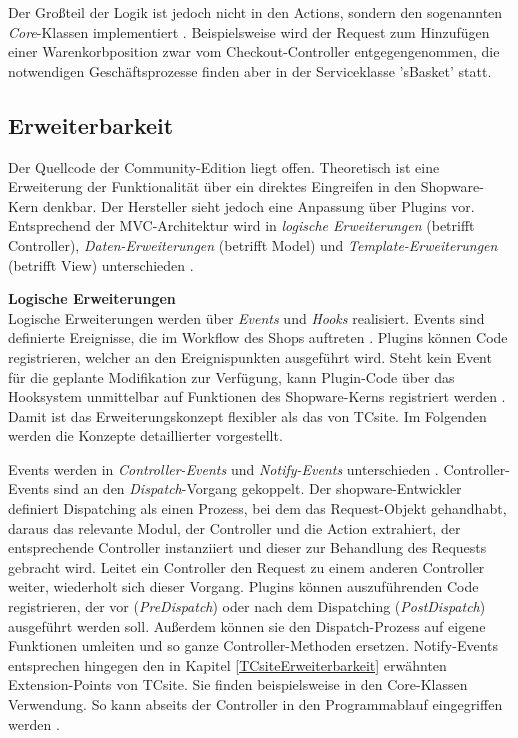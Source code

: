 \documentclass[11pt, a4paper, titlepage, listof=totoc, bibliography=totoc, index=totoc, twoside, openright, headings=normal, draft]{scrreprt}
\begin{document}
Der Großteil der Logik ist jedoch nicht in den Actions, sondern den sogenannten \emph{Core}-Klassen implementiert \citep{shopware4Docs}. Beispielsweise wird der Request zum Hinzufügen einer Warenkorbposition zwar vom Checkout-Controller entgegengenommen, die notwendigen Geschäftsprozesse finden aber in der Serviceklasse 'sBasket' statt.

\subsection{Erweiterbarkeit}
\label{shopwareErweiterbarkeit}
Der Quellcode der Community-Edition liegt offen. Theoretisch ist eine Erweiterung der Funktionalität über ein direktes Eingreifen in den Shopware-Kern denkbar. Der Hersteller sieht jedoch eine Anpassung über Plugins vor. Entsprechend der \ac{MVC}-Architektur wird in \emph{logische Erweiterungen} (betrifft Controller), \emph{Daten-Erweiterungen} (betrifft Model) und \emph{Template-Erweiterungen} (betrifft View) unterschieden \citep{shopware5Docs}.

\textbf{Logische Erweiterungen}\\
Logische Erweiterungen werden über \emph{Events} und \emph{Hooks} realisiert. Events sind \glqq definierte Ereignisse, die im Workflow des Shops auftreten\grqq{} \citep{shopware4Docs}. Plugins können Code registrieren, welcher an den Ereignispunkten ausgeführt wird. Steht kein Event für die geplante Modifikation zur Verfügung, kann Plugin-Code über das Hooksystem unmittelbar auf Funktionen des Shopware-Kerns registriert werden \citep{shopware5Docs}. Damit ist das Erweiterungskonzept flexibler als das von TCsite. Im Folgenden werden die Konzepte detaillierter vorgestellt.

Events werden in \emph{Controller-Events} und \emph{Notify-Events} unterschieden \citep{shopware4Docs}. Controller-Events sind an den \emph{Dispatch}-Vorgang gekoppelt. Der shopware-Entwickler \citet{noegel15Diaspatch} definiert Dispatching als einen Prozess, bei dem das Request-Objekt gehandhabt, daraus das relevante Modul, der Controller und die Action extrahiert, der entsprechende Controller instanziiert und dieser zur Behandlung des Requests gebracht wird. Leitet ein Controller den Request zu einem anderen Controller weiter, wiederholt sich dieser Vorgang. Plugins können auszuführenden Code registrieren, der vor (\emph{PreDispatch}) oder nach dem Dispatching (\emph{PostDispatch}) ausgeführt werden soll. Außerdem können sie den Dispatch-Prozess auf eigene Funktionen umleiten und so ganze Controller-Methoden ersetzen. Notify-Events entsprechen hingegen den in Kapitel \ref{TCsiteErweiterbarkeit} erwähnten Extension-Points von TCsite. Sie finden beispielsweise in den Core-Klassen Verwendung. So kann abseits der Controller in den Programmablauf eingegriffen werden \citep{shopware4Docs}.
\end{document}

